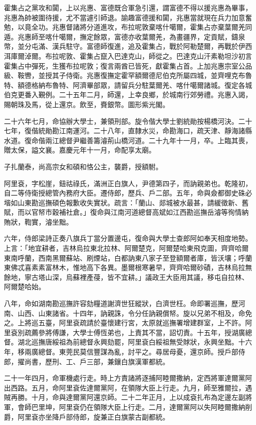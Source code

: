 \begin{pinyinscope}
霍集占之黨攻和闐，上以兆惠、富德既合軍急引還，謂富德不得以援兆惠為畢事，兆惠為帥被圍待援，尤不當遽引師退。諭趣富德援和闐，兆惠當就現在兵力加意奮勉，以竟全功。兆惠督諸將分道進攻，布拉呢敦棄喀什噶爾，霍集占亦棄葉爾羌同遁。兆惠師至喀什噶爾，撫定餘眾，富德亦收葉爾羌，為畫疆界，定貢賦，鑄泉幣，並分屯滿、漢兵駐守。富德師復進，追及霍集占，戰於阿勒楚爾，再戰於伊西洱庫爾淖爾。布拉呢敦、霍集占竄入巴達克山，師從之。巴達克山汗素勒坦沙初言霍集占中彈死，生獲布拉呢敦；復言兩酋已皆死，獻霍集占首。上加兆惠宗室公品級、鞍轡，並授其子侍衛。兆惠復撫定霍罕額爾德尼伯克所屬四城，並齊哩克布魯特、額德格納布魯特、阿濟畢部眾，請留兵分駐葉爾羌、喀什噶爾諸城。復定各城伯克更番入覲例。二十五年二月，師還，上幸良鄉，於城南行郊勞禮。兆惠入謁，賜朝珠及馬，從上還京。飲至，賚銀幣。圖形紫光閣。

二十六年七月，命協辦大學士，兼領刑部。旋令偕大學士劉統勛按楊橋河決。二十七年，復偕統勛勘江南運河。二十八年，直隸水災，命勘海口，疏天津、靜海諸縣水道。復命偕兩江總督尹繼善籌濬荊山橋河道。二十九年十一月，卒。上臨其喪，贈太保，謚文襄。嘉慶元年十一月，命配享太廟。

子扎蘭泰，尚高宗女和碩和恪公主，襲爵，授額駙。

阿里袞，字松崖，鈕祜祿氏，滿洲正白旗人，尹德第四子，而訥親弟也。乾隆初，自二等侍衛授總管內務府大臣。遷侍郎，歷兵、戶二部。五年，命與僉都御史硃必堦如山東勘巡撫碩色報歉收失實狀。疏言：「蘭山、郯城被水最甚，請緩徵新、舊賦，而以官帑市穀補社倉。」復命與江南河道總督高斌如江西勘巡撫岳濬等徇情納賄狀，鞫實，濬坐黜。

六年，侍郎梁詩正奏八旗兵丁當分置邊屯，復命與大學士查郎阿如奉天相度地勢。上言：「地宜耕者，吉林烏拉東北拉林、阿爾楚克，阿爾楚哈東飛克圖，齊齊哈爾東南呼蘭，西南黑爾蘇站、刷煙站，白都訥東八家子至登額爾者庫，皆沃壤；呼蘭東佛忒喜素素富林木，惟地高下各異。墨爾根寒暑早，齊齊哈爾砂磧，吉林烏拉無餘地，寧古塔山深，烏蘇裡產葠，皆不宜耕。」議政王大臣用其議，移屯自拉林、阿爾楚哈始。

八年，命如湖南勘巡撫許容劾糧道謝濟世狂縱狀，白濟世枉。命即署巡撫，歷河南、山西、山東諸省。十四年，訥親誅，令分任訥親償帑。旋以兄弟不相及，命免之。上將巡五臺，阿里袞疏請於臺懷建行宮，太原就巡撫署增建群室，上不許。阿里袞別疏薦參將傅謙，大學士傅恆弟也，上責其不當，詔切責。十五年，授湖廣總督。湖北巡撫唐綏祖為前總督永興劾罷，阿里袞白綏祖無受賕狀，永興坐黜。十六年，移兩廣總督。東莞民莫信豐謀為亂，討平之。尋居母憂，還京師。授戶部侍郎，擢尚書，歷刑、工、戶三部，兼鑲白旗漢軍都統。

二十一年四月，命軍機處行走。時上方責諸將逐捕阿睦爾撒納，定西將軍達爾黨阿出西路。五月，命阿里袞佐達爾黨阿，在領隊大臣上行走。九月，師至雅爾拉，遇賊再勝。十月，命與達爾黨阿還京師。二十二年正月，上以成袞扎布為定邊左副將軍，會師巴里坤，阿里袞仍在領隊大臣上行走。二月，達爾黨阿以失阿睦爾撒納削爵，阿里袞亦坐降戶部侍郎，旋兼正白旗蒙古副都統。


\end{pinyinscope}
